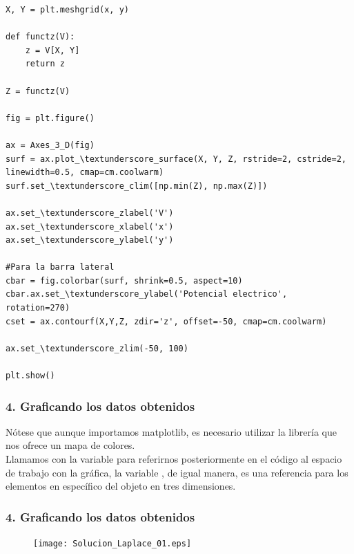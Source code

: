 {\begin{frame}
\begin{lstlisting}[caption=Graficando la solución, style=FormattedNumber, basicstyle=\linespread{1.1}\ttfamily=\small, columns=fullflexible]
X, Y = plt.meshgrid(x, y)

def functz(V):
    z = V[X, Y]
    return z

Z = functz(V)

fig = plt.figure()

ax = Axes_3_D(fig)
surf = ax.plot_\textunderscore_surface(X, Y, Z, rstride=2, cstride=2, linewidth=0.5, cmap=cm.coolwarm)
surf.set_\textunderscore_clim([np.min(Z), np.max(Z)])

ax.set_\textunderscore_zlabel('V')
ax.set_\textunderscore_xlabel('x')
ax.set_\textunderscore_ylabel('y')

#Para la barra lateral
cbar = fig.colorbar(surf, shrink=0.5, aspect=10)
cbar.ax.set_\textunderscore_ylabel('Potencial electrico', rotation=270)
cset = ax.contourf(X,Y,Z, zdir='z', offset=-50, cmap=cm.coolwarm)

ax.set_\textunderscore_zlim(-50, 100)

plt.show()
\end{lstlisting}
\end{frame}
}
\begin{frame}
\frametitle{4. Graficando los datos obtenidos}
Nótese que aunque importamos matplotlib, es necesario utilizar la librería  que nos ofrece un mapa de colores.
\\
\medskip
Llamamos con la variable  para referirnos posteriormente en el código al espacio de trabajo con la gráfica, la variable , de igual manera, es una referencia para los elementos en específico del objeto en tres dimensiones.
\end{frame}
{
\begin{frame}[fragile]
\frametitle{4. Graficando los datos obtenidos}
\begin{figure}
	\centering
	\texttt{[image: Solucion\_Laplace\_01.eps]} 
\end{figure}
\end{frame}
}
